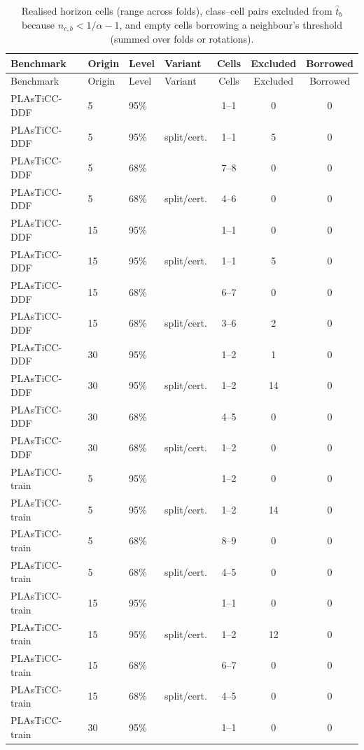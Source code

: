 \begingroup
\scriptsize
\begin{longtable}{llllccc}
\caption{Realised horizon cells (range across folds), class--cell pairs excluded from $\hat t_b$ because $n_{c,b}<1/\alpha-1$, and empty cells borrowing a neighbour's threshold (summed over folds or rotations).}
\label{tab:excluded}\\
\toprule
Benchmark & Origin & Level & Variant & Cells & Excluded & Borrowed \\
\midrule
\endfirsthead
\toprule
Benchmark & Origin & Level & Variant & Cells & Excluded & Borrowed \\
\midrule
\endhead
PLAsTiCC-DDF & 5 & 95\% & \gamut{} & 1--1 & 0 & 0 \\
PLAsTiCC-DDF & 5 & 95\% & split/cert. & 1--1 & 5 & 0 \\
PLAsTiCC-DDF & 5 & 68\% & \gamut{} & 7--8 & 0 & 0 \\
PLAsTiCC-DDF & 5 & 68\% & split/cert. & 4--6 & 0 & 0 \\
PLAsTiCC-DDF & 15 & 95\% & \gamut{} & 1--1 & 0 & 0 \\
PLAsTiCC-DDF & 15 & 95\% & split/cert. & 1--1 & 5 & 0 \\
PLAsTiCC-DDF & 15 & 68\% & \gamut{} & 6--7 & 0 & 0 \\
PLAsTiCC-DDF & 15 & 68\% & split/cert. & 3--6 & 2 & 0 \\
PLAsTiCC-DDF & 30 & 95\% & \gamut{} & 1--2 & 1 & 0 \\
PLAsTiCC-DDF & 30 & 95\% & split/cert. & 1--2 & 14 & 0 \\
PLAsTiCC-DDF & 30 & 68\% & \gamut{} & 4--5 & 0 & 0 \\
PLAsTiCC-DDF & 30 & 68\% & split/cert. & 1--2 & 0 & 0 \\
PLAsTiCC-train & 5 & 95\% & \gamut{} & 1--2 & 0 & 0 \\
PLAsTiCC-train & 5 & 95\% & split/cert. & 1--2 & 14 & 0 \\
PLAsTiCC-train & 5 & 68\% & \gamut{} & 8--9 & 0 & 0 \\
PLAsTiCC-train & 5 & 68\% & split/cert. & 4--5 & 0 & 0 \\
PLAsTiCC-train & 15 & 95\% & \gamut{} & 1--1 & 0 & 0 \\
PLAsTiCC-train & 15 & 95\% & split/cert. & 1--2 & 12 & 0 \\
PLAsTiCC-train & 15 & 68\% & \gamut{} & 6--7 & 0 & 0 \\
PLAsTiCC-train & 15 & 68\% & split/cert. & 4--5 & 0 & 0 \\
PLAsTiCC-train & 30 & 95\% & \gamut{} & 1--1 & 0 & 0 \\

\end{longtable}

